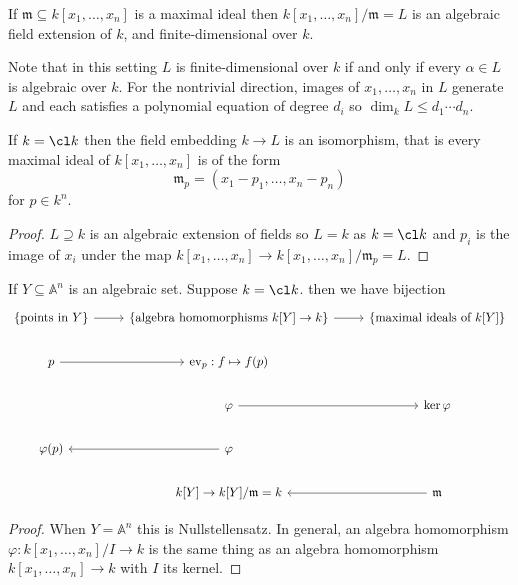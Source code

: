\documentclass[a4paper]{article}
\renewcommand{\A}{\mathbb{A}}
\begin{document}
\begin{theorem}[Nullstellensatz]\leavevmode
  \label{thm:Nullstellensatz}
  If \(\mathfrak m \subseteq k[x_1, \dots, x_n]\) is a maximal ideal then \(k[x_1, \dots, x_n]/\mathfrak m = L\) is an algebraic field extension of \(k\), and finite-dimensional over \(k\).
\end{theorem}

Note that in this setting \(L\) is finite-dimensional over \(k\) if and only if every \(\alpha \in L\) is algebraic over \(k\). For the nontrivial direction, images of \(x_1, \dots, x_n\) in \(L\) generate \(L\) and each satisfies a polynomial equation of degree \(d_i\) so \(\dim_k L \leq d_1 \cdots d_n\).

\begin{corollary}
  If \(k = \cl k\) then the field embedding \(k \to L\) is an isomorphism, that is every maximal ideal of \(k[x_1, \dots, x_n]\) is of the form
  \[
    \mathfrak m_p = (x_1 - p_1, \dots, x_n - p_n)
  \]
  for \(p \in k^n\).
\end{corollary}

\begin{proof}
  \(L \supseteq k\) is an algebraic extension of fields so \(L = k\) as \(k = \cl k\) and \(p_i\) is the image of \(x_i\) under the map \(k[x_1, \dots, x_n] \to k[x_1, \dots, x_n]/\mathfrak m_p = L\).
\end{proof}

\begin{corollary}
  If \(Y \subseteq \A^n\) is an algebraic set. Suppose \(k = \cl k\). then we have bijection
  \[
    \begin{tikzcd}
      \{\text{points in } Y\} \ar[r] & \{\text{algebra homomorphisms } k[Y] \to k\} \ar[r] & \{\text{maximal ideals of } k[Y]\} \\
      p \ar[r] & \operatorname{ev}_p: f \mapsto f(p) \\
      & \varphi \ar[r] & \ker \varphi \\
      \varphi(p) & \varphi \ar[l] \\
      & k[Y] \to k[Y]/\mathfrak m = k & \mathfrak m \ar[l]
    \end{tikzcd}
  \]
\end{corollary}

\begin{proof}
  When \(Y = \A^n\) this is Nullstellensatz. In general, an algebra homomorphism \(\varphi: k[x_1, \dots, x_n]/I \to k\) is the same thing as an algebra homomorphism \(k[x_1, \dots, x_n] \to k\) with \(I\) its kernel.
\end{proof}
\end{document}
